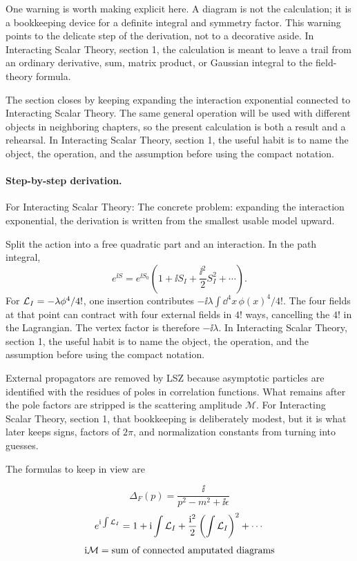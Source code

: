One warning is worth making explicit here.  A diagram is not the calculation; it is a bookkeeping device for a definite integral and symmetry factor.  This warning points to the delicate step of the derivation, not to a decorative aside.  In Interacting Scalar Theory, section 1, the calculation is meant to leave a trail from an ordinary derivative, sum, matrix product, or Gaussian integral to the field-theory formula.

The section closes by keeping expanding the interaction exponential connected to Interacting Scalar Theory.  The same general operation will be used with different objects in neighboring chapters, so the present calculation is both a result and a rehearsal.  In Interacting Scalar Theory, section 1, the useful habit is to name the object, the operation, and the assumption before using the compact notation.



\paragraph{Step-by-step derivation.}

For Interacting Scalar Theory: The concrete problem: expanding the interaction exponential, the derivation is written from the smallest usable model upward.

Split the action into a free quadratic part and an interaction.  In the path integral,
\[
  e^{\ii S}=e^{\ii S_0}\left(1+\ii S_I+\frac{\ii^2}{2}S_I^2+\cdots\right).
\]
For \(\mathcal L_I=-\lambda\phi^4/4!\), one insertion contributes \(-\ii\lambda\int\dd^4x\,\phi(x)^4/4!\).  The four fields at that point can contract with four external fields in \(4!\) ways, cancelling the \(4!\) in the Lagrangian.  The vertex factor is therefore \(-\ii\lambda\).  In Interacting Scalar Theory, section 1, the useful habit is to name the object, the operation, and the assumption before using the compact notation.

External propagators are removed by LSZ because asymptotic particles are identified with the residues of poles in correlation functions.  What remains after the pole factors are stripped is the scattering amplitude \(\mathcal M\).  For Interacting Scalar Theory, section 1, that bookkeeping is deliberately modest, but it is what later keeps signs, factors of \(2\pi\), and normalization constants from turning into guesses.

The formulas to keep in view are

\[
  \Delta_F(p)=\frac{\ii}{p^2-m^2+\ii\epsilon}
\]
\[
  e^{\mathrm i\int\mathcal L_I}=1+\mathrm i\int\mathcal L_I+\frac{\mathrm i^2}{2}\left(\int\mathcal L_I\right)^2+\cdots
\]
\[
  \mathrm i\mathcal M=\hbox{sum of connected amputated diagrams}
\]

